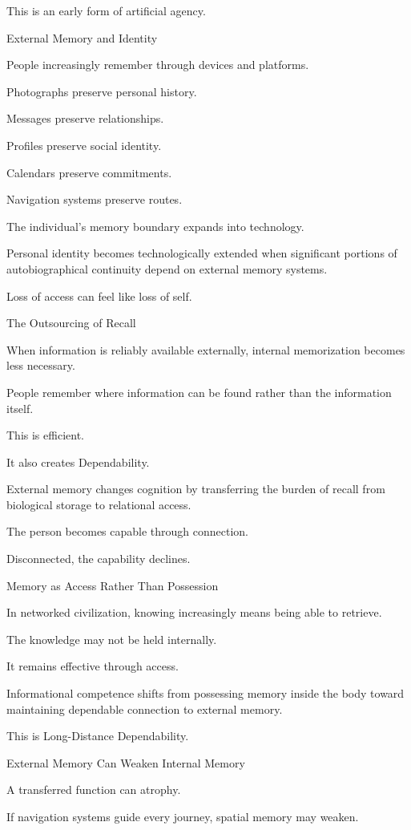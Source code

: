 This is an early form of artificial agency.

External Memory and Identity

People increasingly remember through devices and platforms.

Photographs preserve personal history.

Messages preserve relationships.

Profiles preserve social identity.

Calendars preserve commitments.

Navigation systems preserve routes.

The individual’s memory boundary expands into technology.

Personal identity becomes technologically extended when significant portions of autobiographical continuity depend on external memory systems.

Loss of access can feel like loss of self.

The Outsourcing of Recall

When information is reliably available externally, internal memorization becomes less necessary.

People remember where information can be found rather than the information itself.

This is efficient.

It also creates Dependability.

External memory changes cognition by transferring the burden of recall from biological storage to relational access.

The person becomes capable through connection.

Disconnected, the capability declines.

Memory as Access Rather Than Possession

In networked civilization, knowing increasingly means being able to retrieve.

The knowledge may not be held internally.

It remains effective through access.

Informational competence shifts from possessing memory inside the body toward maintaining dependable connection to external memory.

This is Long-Distance Dependability.

External Memory Can Weaken Internal Memory

A transferred function can atrophy.

If navigation systems guide every journey, spatial memory may weaken.


